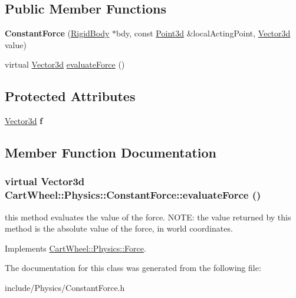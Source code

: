 \subsection*{Public Member Functions}
\begin{DoxyCompactItemize}
\item 
\hypertarget{classCartWheel_1_1Physics_1_1ConstantForce_a07015a7073cd6041c5bf3b7e7d3a8692}{
{\bfseries ConstantForce} (\hyperlink{classCartWheel_1_1Physics_1_1RigidBody}{RigidBody} $\ast$bdy, const \hyperlink{classCartWheel_1_1Math_1_1Point3d}{Point3d} \&localActingPoint, \hyperlink{classCartWheel_1_1Math_1_1Vector3d}{Vector3d} value)}
\label{classCartWheel_1_1Physics_1_1ConstantForce_a07015a7073cd6041c5bf3b7e7d3a8692}

\item 
virtual \hyperlink{classCartWheel_1_1Math_1_1Vector3d}{Vector3d} \hyperlink{classCartWheel_1_1Physics_1_1ConstantForce_a93106709ed5d357d1cfd18cca1921bad}{evaluateForce} ()
\end{DoxyCompactItemize}
\subsection*{Protected Attributes}
\begin{DoxyCompactItemize}
\item 
\hypertarget{classCartWheel_1_1Physics_1_1ConstantForce_a79de8d216fb54419b3f9f205e09fb8b1}{
\hyperlink{classCartWheel_1_1Math_1_1Vector3d}{Vector3d} {\bfseries f}}
\label{classCartWheel_1_1Physics_1_1ConstantForce_a79de8d216fb54419b3f9f205e09fb8b1}

\end{DoxyCompactItemize}


\subsection{Member Function Documentation}
\hypertarget{classCartWheel_1_1Physics_1_1ConstantForce_a93106709ed5d357d1cfd18cca1921bad}{
\subsubsection[{evaluateForce}]{\setlength{\rightskip}{0pt plus 5cm}virtual {\bf Vector3d} CartWheel::Physics::ConstantForce::evaluateForce ()}}
\label{classCartWheel_1_1Physics_1_1ConstantForce_a93106709ed5d357d1cfd18cca1921bad}
this method evaluates the value of the force. NOTE: the value returned by this method is the absolute value of the force, in world coordinates. 

Implements \hyperlink{classCartWheel_1_1Physics_1_1Force_a40ed851fc5773dfd6e00a6facf7cf719}{CartWheel::Physics::Force}.



The documentation for this class was generated from the following file:\begin{DoxyCompactItemize}
\item 
include/Physics/ConstantForce.h\end{DoxyCompactItemize}

